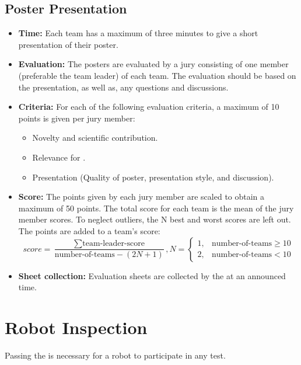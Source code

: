 \subsection*{Poster Presentation}
\label{sec:setupdays:posterpresentation}
\begin{itemize}
	\item \textbf{Time:} Each team has a maximum of three minutes to give a short presentation of their poster.
	\item \textbf{Evaluation:} The posters are evaluated by a jury consisting of one member (preferable the team leader) of each team. The evaluation should be based on the presentation, as well as, any questions and discussions.
	\item \textbf{Criteria:} For each of the following evaluation criteria, a maximum of 10 points is given per jury member:
	\begin{itemize}
		\item Novelty and scientific contribution.
		\item Relevance for \RoboCup\AtHome{}.
		\item Presentation (Quality of poster, presentation style, and discussion).
	\end{itemize}
	\item \textbf{Score:} The points given by each jury member are scaled to obtain a maximum of 50 points. The total score for each team is the mean of the jury member scores. To neglect outliers, the N best and worst scores are left out. The points are added to a team's \SONE{} score:
	$$
	score=\frac{\sum \text{team-leader-score}}{\text{number-of-teams}-\left ( 2N+1  \right )},N=\left\{\begin{matrix}
	1, & \text{number-of-teams} \geq 10\\
	2, & \text{number-of-teams} < 10
	\end{matrix}\right.
	$$
	\item \textbf{Sheet collection:} Evaluation sheets are collected by the \OC{} at an announced time.
\end{itemize}

\section{Robot Inspection}
\label{sec:setupdays:inspection}
Passing the \RobotInspection{} is necessary for a robot to participate in any test.

